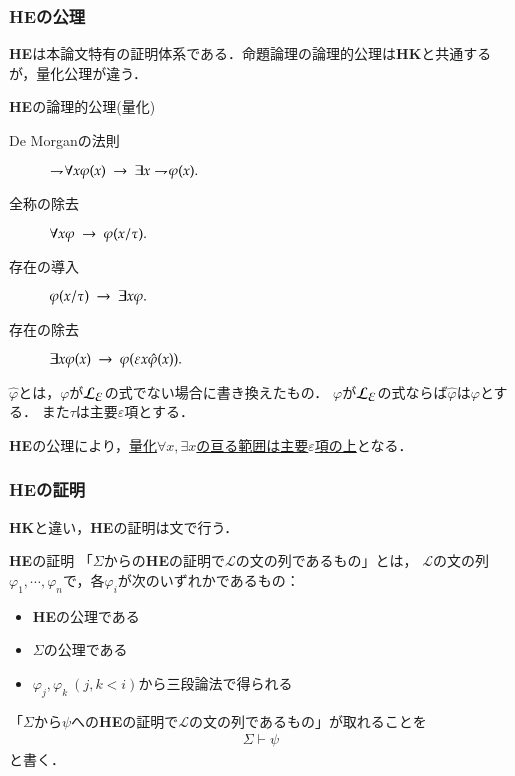 \documentclass[dvipdfmx,10pt,notheorems]{beamer}
\theoremstyle{definition}
\newcommand{\lang}[1]{\mathcal{L}_{\scalebox{1.2}{$#1$}}} %
\newcommand{\negation}{\rightharpoondown\hspace{-0.25em}} %
\newcommand{\rarrow}{\hspace{0.25em}\rightarrow\hspace{0.25em}} %
\begin{document}
\begin{frame}\frametitle{{\bf HE}の公理}
	{\bf HE}は本論文特有の証明体系である．命題論理の論理的公理は{\bf HK}と共通するが，量化公理が違う．
	
	\begin{alertblock}{{\bf HE}の論理的公理(量化)}
		\begin{description}
			\item[De Morganの法則] $\negation \forall x \varphi(x) \rarrow \exists x \negation \varphi(x).$
				
			\item[全称の除去] $\forall x \varphi \rarrow \varphi(x/\tau).$
				
			\item[存在の導入] $\varphi(x/\tau) \rarrow \exists x \varphi.$
				
			\item[存在の除去] $\exists x \varphi(x) \rarrow \varphi(\varepsilon x \hat{\varphi}(x)).$
		\end{description}
		$\hat{\varphi}$とは，$\varphi$が$\lang{\varepsilon}$の式でない場合に書き換えたもの．
		$\varphi$が$\lang{\varepsilon}$の式ならば$\hat{\varphi}$は$\varphi$とする．
		また$\tau$は主要$\varepsilon$項とする．
	\end{alertblock}
	
	{\bf HE}の公理により，\underline{量化$\forall x, \exists x$の亘る範囲は主要$\varepsilon$項の上}となる．
\end{frame}

\begin{frame}\frametitle{{\bf HE}の証明}
	{\bf HK}と違い，{\bf HE}の証明は文で行う．
	
	\begin{exampleblock}{{\bf HE}の証明}
		「$\Sigma$からの{\bf HE}の証明で$\mathcal{L}$の文の列であるもの」とは，
		$\mathcal{L}$の文の列$\varphi_{1},\cdots,\varphi_{n}$で，各$\varphi_{i}$が次のいずれかであるもの：
		\begin{itemize}
			\item {\bf HE}の公理である
			\item $\Sigma$の公理である
			\item $\varphi_{j},\varphi_{k}\ (j,k < i)$から三段論法で得られる
		\end{itemize}
	\end{exampleblock}
	
	「$\Sigma$から$\psi$への{\bf HE}の証明で$\mathcal{L}$の文の列であるもの」が取れることを
	\begin{align}
		\Sigma \vdash \psi
	\end{align}
	と書く．
\end{frame}
\end{document}
